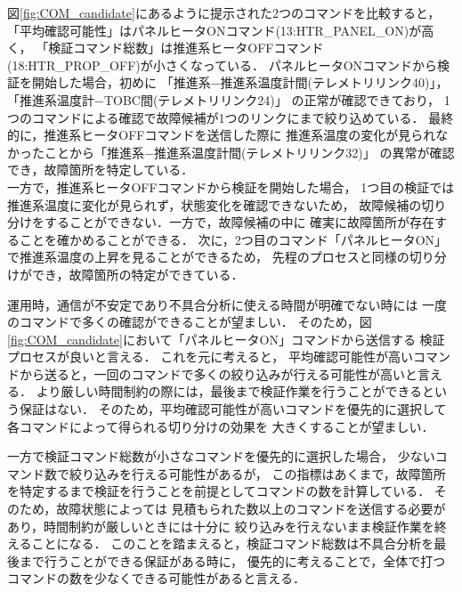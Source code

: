 \documentclass[11pt]{jsreport}
\begin{document}
図\ref{fig:COM_candidate}にあるように提示された2つのコマンドを比較すると，
「平均確認可能性」はパネルヒータONコマンド(13:HTR\_PANEL\_ON)が高く，
「検証コマンド総数」は推進系ヒータOFFコマンド(18:HTR\_PROP\_OFF)が小さくなっている．
パネルヒータONコマンドから検証を開始した場合，初めに
「推進系−推進系温度計間(テレメトリリンク40)」，「推進系温度計−TOBC間(テレメトリリンク24)」
の正常が確認できており，
1つのコマンドによる確認で故障候補が1つのリンクにまで絞り込めている．
最終的に，推進系ヒータOFFコマンドを送信した際に%
推進系温度の変化が見られなかったことから「推進系−推進系温度計間(テレメトリリンク32)」
の異常が確認でき，故障箇所を特定している．\\
一方で，推進系ヒータOFFコマンドから検証を開始した場合，
1つ目の検証では推進系温度に変化が見られず，状態変化を確認できないため，
故障候補の切り分けをすることができない．一方で，故障候補の中に
確実に故障箇所が存在することを確かめることができる．
次に，2つ目のコマンド「パネルヒータON」で推進系温度の上昇を見ることができるため，
先程のプロセスと同様の切り分けができ，故障箇所の特定ができている．

運用時，通信が不安定であり不具合分析に使える時間が明確でない時には
一度のコマンドで多くの確認ができることが望ましい．
そのため，図\ref{fig:COM_candidate}において「パネルヒータON」コマンドから送信する
検証プロセスが良いと言える．
これを元に考えると，
平均確認可能性が高いコマンドから送ると，一回のコマンドで多くの絞り込みが行える可能性が高いと言える．
より厳しい時間制約の際には，最後まで検証作業を行うことができるという保証はない．
そのため，平均確認可能性が高いコマンドを優先的に選択して各コマンドによって得られる切り分けの効果を
大きくすることが望ましい．

一方で検証コマンド総数が小さなコマンドを優先的に選択した場合，
少ないコマンド数で絞り込みを行える可能性があるが，
この指標はあくまで，故障箇所を特定するまで検証を行うことを前提としてコマンドの数を計算している．
そのため，故障状態によっては
見積もられた数以上のコマンドを送信する必要があり，時間制約が厳しいときには十分に
絞り込みを行えないまま検証作業を終えることになる．
このことを踏まえると，検証コマンド総数は不具合分析を最後まで行うことができる保証がある時に，
優先的に考えることで，全体で打つコマンドの数を少なくできる可能性があると言える．
\end{document}
